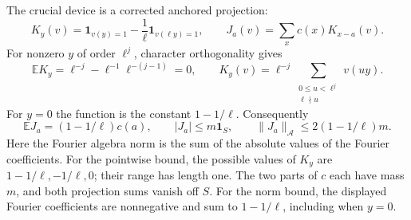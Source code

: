 \documentclass[11pt]{article}
\theoremstyle{definition}
\theoremstyle{remark}
\begin{document}
The crucial device is a corrected anchored projection:
\[
 K_y(v)=\mathbf1_{v(y)=1}
       -\frac1\ell\mathbf1_{v(\ell y)=1},
 \qquad J_a(v)=\sum_xc(x)K_{x-a}(v).
\]
For nonzero $y$ of order $\ell^j$, character orthogonality gives
\[
 \mathbb E K_y=\ell^{-j}-\ell^{-1}\ell^{-(j-1)}=0,
 \qquad
 K_y(v)=\ell^{-j}\!\sum_{\substack{0\le u<\ell^j\\\ell\nmid u}}v(uy).
\]
For $y=0$ the function is the constant $1-1/\ell$.  Consequently
\begin{equation}\label{eq:primary-detector}
 \mathbb EJ_a=(1-1/\ell)c(a),\qquad
 |J_a|\le m\mathbf1_S,\qquad
 \|J_a\|_{\mathcal A}\le2(1-1/\ell)m.
\end{equation}
Here the Fourier algebra norm is the sum of the absolute values of the
Fourier coefficients.  For the pointwise bound, the possible values of
$K_y$ are $1-1/\ell,-1/\ell,0$; their range has length one.  The two
parts of $c$ each have mass $m$, and both projection sums vanish off
$S$.  For the norm bound, the displayed Fourier coefficients are
nonnegative and sum to $1-1/\ell$, including when $y=0$.
\end{document}
